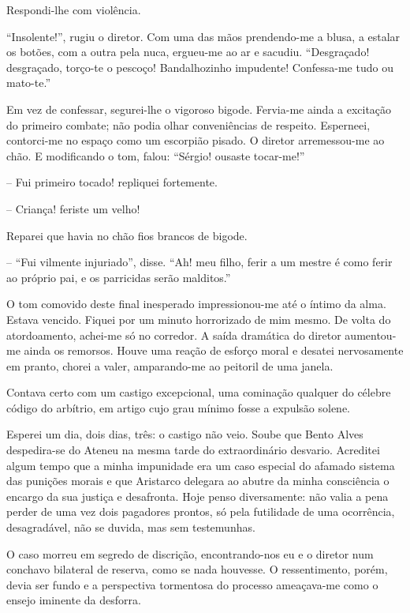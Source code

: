 Respondi{}-lhe com violência. 

``Insolente!'', rugiu o diretor. Com uma das
mãos prendendo{}-me a blusa, a estalar os botões, com a outra pela
nuca, ergueu{}-me ao ar e sacudiu. ``Desgraçado! desgraçado, torço{}-te
o pescoço! Bandalhozinho impudente! Confessa{}-me tudo ou mato{}-te.''

Em vez de confessar, segurei{}-lhe o vigoroso bigode. Fervia{}-me ainda
a excitação do primeiro combate; não podia olhar conveniências de
respeito. Esperneei, contorci{}-me no espaço como um escorpião pisado.
O diretor arremessou{}-me ao chão. E modificando o tom, falou: ``Sérgio!
ousaste tocar{}-me!'' 

-- Fui primeiro tocado! repliquei fortemente. 

-- Criança! feriste um velho! 

Reparei que havia no chão fios brancos de bigode. 

-- ``Fui vilmente injuriado'', disse. ``Ah! meu filho, ferir a
um mestre é como ferir ao próprio pai, e os parricidas serão malditos.''

O tom comovido deste final inesperado impressionou{}-me até o íntimo da
alma. Estava vencido. Fiquei por um minuto horrorizado de mim mesmo. De
volta do atordoamento, achei{}-me só no corredor. A saída dramática do
diretor aumentou{}-me ainda os remorsos. Houve uma reação de esforço
moral e desatei nervosamente em pranto, chorei a valer, amparando{}-me
ao peitoril de uma janela. 

Contava certo com um castigo excepcional,
uma cominação qualquer do célebre código do arbítrio, em artigo cujo
grau mínimo fosse a expulsão solene. 

Esperei um dia, dois dias, três: o
castigo não veio. Soube que Bento Alves despedira{}-se do Ateneu na
mesma tarde do extraordinário desvario. Acreditei algum tempo que a
minha impunidade era um caso especial do afamado sistema das punições
morais e que Aristarco delegara ao abutre da minha consciência o
encargo da sua justiça e desafronta. Hoje penso diversamente: não valia
a pena perder de uma vez dois pagadores prontos, só pela futilidade de
uma ocorrência, desagradável, não se duvida, mas sem testemunhas. 

O caso morreu em segredo de discrição, encontrando{}-nos eu e o diretor
num conchavo bilateral de reserva, como se nada houvesse. O
ressentimento, porém, devia ser fundo e a perspectiva tormentosa do
processo ameaçava{}-me como o ensejo iminente da desforra.

